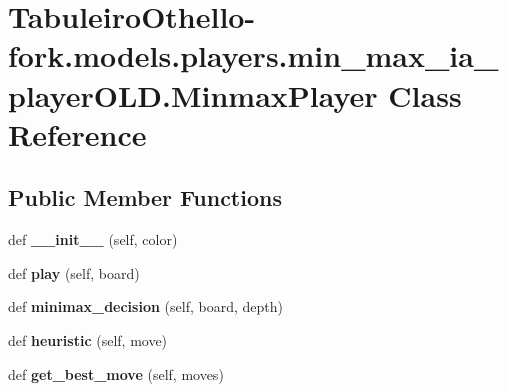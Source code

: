 \hypertarget{class_tabuleiro_othello-fork_1_1models_1_1players_1_1min__max__ia__player_o_l_d_1_1_minmax_player}{}\section{Tabuleiro\+Othello-\/fork.models.\+players.\+min\+\_\+max\+\_\+ia\+\_\+player\+O\+L\+D.\+Minmax\+Player Class Reference}
\label{class_tabuleiro_othello-fork_1_1models_1_1players_1_1min__max__ia__player_o_l_d_1_1_minmax_player}
\subsection*{Public Member Functions}
\begin{DoxyCompactItemize}
\item 
\hypertarget{class_tabuleiro_othello-fork_1_1models_1_1players_1_1min__max__ia__player_o_l_d_1_1_minmax_player_ac24a2b153ba54d9f879804c0eb46a272}{}def {\bfseries \+\_\+\+\_\+init\+\_\+\+\_\+} (self, color)\label{class_tabuleiro_othello-fork_1_1models_1_1players_1_1min__max__ia__player_o_l_d_1_1_minmax_player_ac24a2b153ba54d9f879804c0eb46a272}

\item 
\hypertarget{class_tabuleiro_othello-fork_1_1models_1_1players_1_1min__max__ia__player_o_l_d_1_1_minmax_player_a4b6020a05f0193e8a1c97a9c0e964abc}{}def {\bfseries play} (self, board)\label{class_tabuleiro_othello-fork_1_1models_1_1players_1_1min__max__ia__player_o_l_d_1_1_minmax_player_a4b6020a05f0193e8a1c97a9c0e964abc}

\item 
\hypertarget{class_tabuleiro_othello-fork_1_1models_1_1players_1_1min__max__ia__player_o_l_d_1_1_minmax_player_aac749d4d83e85306cef6d91bf2ae62e3}{}def {\bfseries minimax\+\_\+decision} (self, board, depth)\label{class_tabuleiro_othello-fork_1_1models_1_1players_1_1min__max__ia__player_o_l_d_1_1_minmax_player_aac749d4d83e85306cef6d91bf2ae62e3}

\item 
\hypertarget{class_tabuleiro_othello-fork_1_1models_1_1players_1_1min__max__ia__player_o_l_d_1_1_minmax_player_aabacc2b1a5c5ec5b09f0274658d50e17}{}def {\bfseries heuristic} (self, move)\label{class_tabuleiro_othello-fork_1_1models_1_1players_1_1min__max__ia__player_o_l_d_1_1_minmax_player_aabacc2b1a5c5ec5b09f0274658d50e17}

\item 
\hypertarget{class_tabuleiro_othello-fork_1_1models_1_1players_1_1min__max__ia__player_o_l_d_1_1_minmax_player_a1944a8deda22a28a54eeb840701432a6}{}def {\bfseries get\+\_\+best\+\_\+move} (self, moves)\label{class_tabuleiro_othello-fork_1_1models_1_1players_1_1min__max__ia__player_o_l_d_1_1_minmax_player_a1944a8deda22a28a54eeb840701432a6}

\end{DoxyCompactItemize}
